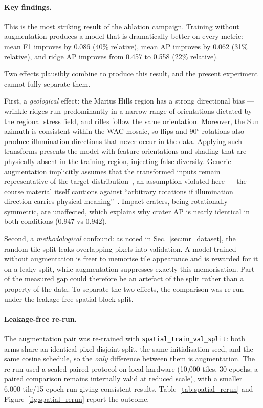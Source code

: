 \paragraph{Key findings.}
This is the most striking result of the ablation campaign. Training without augmentation produces a model that is dramatically better on every metric: mean F1 improves by 0.086 (40\% relative), mean AP improves by 0.062 (31\% relative), and ridge AP improves from 0.457 to 0.558 (22\% relative).

Two effects plausibly combine to produce this result, and the present experiment cannot fully separate them.

First, a \emph{geological} effect: the Marius Hills region has a strong directional bias — wrinkle ridges run predominantly in a narrow range of orientations dictated by the regional stress field, and rilles follow the same orientation. Moreover, the Sun azimuth is consistent within the WAC mosaic, so flips and $90°$ rotations also produce illumination directions that never occur in the data. Applying such transforms presents the model with feature orientations and shading that are physically absent in the training region, injecting false diversity. Generic augmentation implicitly assumes that the transformed inputs remain representative of the target distribution~\cite{shorten2019augmentation}, an assumption violated here — the course material itself cautions against ``arbitrary rotations if illumination direction carries physical meaning''~\cite{zingales2026lecture}. Impact craters, being rotationally symmetric, are unaffected, which explains why crater AP is nearly identical in both conditions (0.947 vs 0.942).

Second, a \emph{methodological} confound: as noted in Sec.~\ref{sec:mr_dataset}, the random tile split leaks overlapping pixels into validation. A model trained without augmentation is freer to memorise tile appearance and is rewarded for it on a leaky split, while augmentation suppresses exactly this memorisation. Part of the measured gap could therefore be an artefact of the split rather than a property of the data. To separate the two effects, the comparison was re-run under the leakage-free spatial block split.

\paragraph{Leakage-free re-run.}
The augmentation pair was re-trained with \texttt{spatial\_train\_val\_split}: both arms share an identical pixel-disjoint split, the same initialisation seed, and the same cosine schedule, so the \emph{only} difference between them is augmentation. The re-run used a scaled paired protocol on local hardware (10{,}000 tiles, 30 epochs; a paired comparison remains internally valid at reduced scale), with a smaller 6{,}000-tile/15-epoch run giving consistent results. Table~\ref{tab:spatial_rerun} and Figure~\ref{fig:spatial_rerun} report the outcome.

